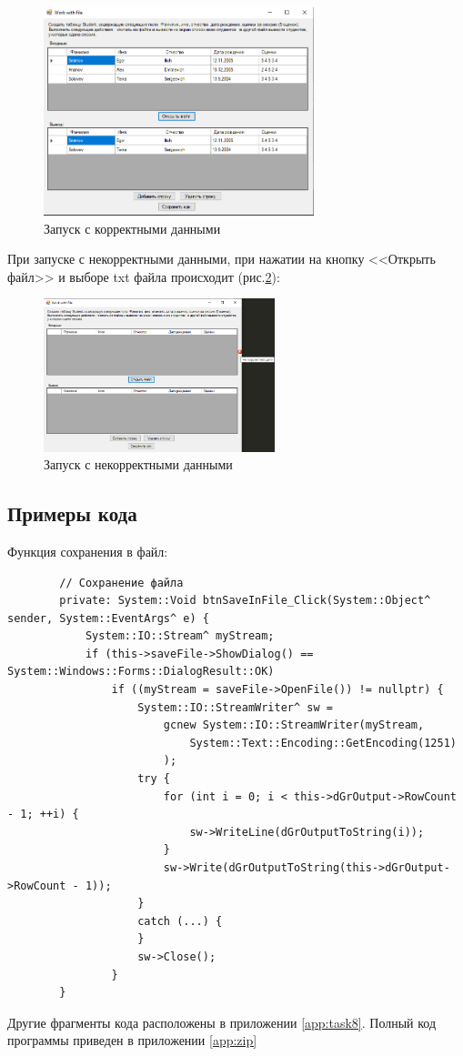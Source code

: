 \begin{figure}[!h]
    \centering
    \includegraphics[width = 0.7\textwidth]{images/Task8/WorkOpenFile.png}
    \caption{Запуск с корректными данными}
    \label{fig:WorkForm8}
\end{figure}

При запуске с некорректными данными, при нажатии на кнопку <<Открыть файл>> и выборе txt файла происходит (рис.\ref{fig:BadInputNotIntForm8}):

\begin{figure}[!h]
    \centering
    \includegraphics[width = 0.6\textwidth]{images/Task8/OpenFileBadData.png}
    \caption{Запуск с некорректными данными}
    \label{fig:BadInputNotIntForm8}
\end{figure}

\subsection{Примеры кода}

Функция сохранения в файл:

\begin{verbatim}
		// Сохранение файла
		private: System::Void btnSaveInFile_Click(System::Object^ sender, System::EventArgs^ e) {
			System::IO::Stream^ myStream;
			if (this->saveFile->ShowDialog() == System::Windows::Forms::DialogResult::OK)
				if ((myStream = saveFile->OpenFile()) != nullptr) {
					System::IO::StreamWriter^ sw =
						gcnew System::IO::StreamWriter(myStream,
							System::Text::Encoding::GetEncoding(1251)
						);
					try {
						for (int i = 0; i < this->dGrOutput->RowCount - 1; ++i) {
							sw->WriteLine(dGrOutputToString(i));
						}
						sw->Write(dGrOutputToString(this->dGrOutput->RowCount - 1));
					}
					catch (...) {
					}
					sw->Close();
				}
		}
\end{verbatim}

Другие фрагменты кода расположены в приложении \ref{app:task8}. Полный код программы приведен в приложении \ref{app:zip}

